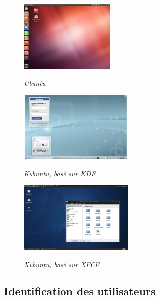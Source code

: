 \documentclass[10pt,fleqn]{article} %
\begin{document}
\begin{figure}[h]
\begin{minipage}[c]{.33\linewidth}
\begin{center}
\includegraphics[height=3.5cm]{images/unity.jpg}

\textit{Ubuntu}
\end{center}
\end{minipage} \hfill
\begin{minipage}[c]{.33\linewidth}
\begin{center}
\includegraphics[height=3.5cm]{images/kbuntu.jpg}

\textit{Kubuntu, basé sur KDE}
\end{center}
\end{minipage} \hfill
\begin{minipage}[c]{.33\linewidth}

\begin{center}
\includegraphics[height=3.5cm]{images/xbuntu.jpg}

\textit{Xubuntu, basé sur XFCE}
\end{center}
\end{minipage} 
\end{figure}

\subsection{Identification des utilisateurs}
\end{document}
